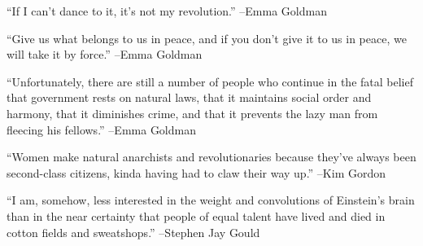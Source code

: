 \documentclass{article}%
\begin{document}
\linebreak%
\vspace{1mm}%
\begin{minipage}{\textwidth}%
\flushleft%
“If I can't dance to it, it's not my revolution.”%
\linebreak%
\vspace{1mm}%
–Emma Goldman%
\linebreak%
\vspace{1mm}%
\end{minipage}%
\linebreak%
\vspace{1mm}%
\begin{minipage}{\textwidth}%
\flushleft%
“Give us what belongs to us in peace, and if you don't give it to us in peace, we will take it by force.”%
\linebreak%
\vspace{1mm}%
–Emma Goldman%
\linebreak%
\vspace{1mm}%
\end{minipage}%
\linebreak%
\vspace{1mm}%
\begin{minipage}{\textwidth}%
\flushleft%
“Unfortunately, there are still a number of people who continue in the fatal belief that government rests on natural laws, that it maintains social order and harmony, that it diminishes crime, and that it prevents the lazy man from fleecing his fellows.”%
\linebreak%
\vspace{1mm}%
–Emma Goldman%
\linebreak%
\vspace{1mm}%
\end{minipage}%
\linebreak%
\vspace{1mm}%
\begin{minipage}{\textwidth}%
\flushleft%
“Women make natural anarchists and revolutionaries because they've always been second{-}class citizens, kinda having had to claw their way up.”%
\linebreak%
\vspace{1mm}%
–Kim Gordon%
\linebreak%
\vspace{1mm}%
\end{minipage}%
\linebreak%
\vspace{1mm}%
\begin{minipage}{\textwidth}%
\flushleft%
“I am, somehow, less interested in the weight and convolutions of Einstein's brain than in the near certainty that people of equal talent have lived and died in cotton fields and sweatshops.”%
\linebreak%
\vspace{1mm}%
–Stephen Jay Gould%
\linebreak%
\vspace{1mm}%
\end{minipage}%
\end{document}
